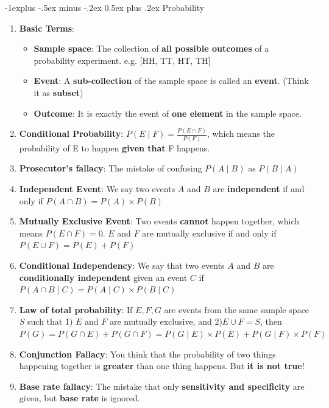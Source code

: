 \documentclass[10pt, landscape]{article}
\makeatletter
\renewcommand{\subsection}{\@startsection{subsection}{2}{0mm}%
                                {-1explus -.5ex minus -.2ex}%
                                {0.5ex plus .2ex}%
                                {\normalfont\normalsize\bfseries}}
\makeatother
\begin{document}
\begin{multicols}{4}
\subsection{Probability}
\begin{enumerate}
    \item \textbf{Basic Terms}:
    \begin{itemize}
        \item \textbf{Sample space}: The collection of \textbf{all possible outcomes} of a probability experiment. e.g. [HH, TT, HT, TH]
        \item \textbf{Event}: A \textbf{sub-collection} of the sample space is called an \textbf{event}. (Think it as \textbf{subset})
        \item \textbf{Outcome}: It is exactly the event of \textbf{one element} in the sample space.
    \end{itemize}
    \item \textbf{Conditional Probability}: $P(E\mid F)=\frac{P(E\cap F)}{P(F)}$, which means the probability of E to happen \textbf{given that} F happens.
    \item \textbf{Prosecutor's fallacy}: The mistake of confusing $P(A\mid B)$ as $P(B \mid A)$
    \item \textbf{Independent Event}: We say two events $A$ and $B$ are \textbf{independent} if and only if $P(A\cap B)=P(A)\times P(B)$
    \item \textbf{Mutually Exclusive Event}: Two events \textbf{cannot} happen together, which means $P(E\cap F)=0$. $E$ and $F$ are mutually exclusive if and only if $P(E\cup F)=P(E)+P(F)$
    \item \textbf{Conditional Independency}: We say that two events $A$ and $B$ are \textbf{conditionally independent} given an event $C$ if $P(A\cap B \mid C)=P(A\mid C)\times P(B\mid C)$
    \item \textbf{Law of total probability}: If $E, F,G$ are events from the same sample space $S$ such that 1) $E$ and $F$ are mutually exclusive, and 2)$E\cup F=S$, then $P(G)=P(G\cap E)+P(G\cap F)=P(G\mid E)\times P(E)+P(G\mid F)\times P(F)$
    \item \textbf{Conjunction Fallacy}: You think that the probability of two things happening together is \textbf{greater} than one thing happens. But \textbf{it is not true}!
    \item \textbf{Base rate fallacy}: The mistake that only \textbf{sensitivity and specificity} are given, but \textbf{base rate} is ignored.
    \begin{itemize}

\end{itemize}
\end{enumerate}
\end{multicols}
\end{document}
